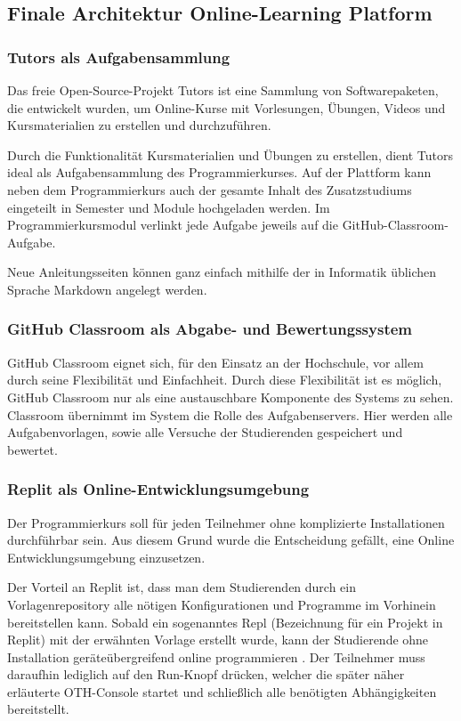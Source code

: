 \subsection{Finale Architektur Online-Learning Platform}
\subsubsection{Tutors als Aufgabensammlung}
Das freie Open-Source-Projekt Tutors ist eine Sammlung von Softwarepaketen,
die entwickelt wurden, um Online-Kurse mit Vorlesungen, Übungen, Videos und
Kursmaterialien zu erstellen und durchzuführen. \parencite{tutors}

Durch die Funktionalität Kursmaterialien und Übungen zu erstellen, dient Tutors
ideal als Aufgabensammlung des Programmierkurses. Auf der Plattform kann neben
dem Programmierkurs auch der gesamte Inhalt des Zusatzstudiums eingeteilt in
Semester und Module hochgeladen werden. Im Programmierkursmodul verlinkt jede 
Aufgabe jeweils auf die GitHub-Classroom-Aufgabe.

Neue Anleitungsseiten können ganz einfach mithilfe der in Informatik üblichen
Sprache Markdown angelegt werden.

\subsubsection{GitHub Classroom als Abgabe- und Bewertungssystem}
GitHub Classroom eignet sich, für den Einsatz an der Hochschule, vor allem durch
seine Flexibilität und Einfachheit. Durch diese Flexibilität ist es möglich,
GitHub Classroom nur als eine austauschbare Komponente des Systems zu sehen.
Classroom übernimmt im System die Rolle des Aufgabenservers. Hier werden alle
Aufgabenvorlagen, sowie alle Versuche der Studierenden gespeichert und bewertet.

\subsubsection{Replit als Online-Entwicklungsumgebung}
Der Programmierkurs soll für jeden Teilnehmer ohne komplizierte Installationen
durchführbar sein. Aus diesem Grund wurde die Entscheidung gefällt, eine
Online Entwicklungsumgebung einzusetzen.

Der Vorteil an Replit ist, dass man dem Studierenden durch ein
Vorlagenrepository alle nötigen Konfigurationen und Programme im Vorhinein
bereitstellen kann. Sobald ein sogenanntes \glqq Repl\grqq{} (Bezeichnung für
ein Projekt in Replit) mit der erwähnten Vorlage erstellt wurde, kann der
Studierende ohne Installation geräteübergreifend online programmieren
\parencite{replit-import-from-github}. Der Teilnehmer muss daraufhin lediglich auf
den \glqq Run\grqq{}-Knopf drücken, welcher die später näher erläuterte
\glqq OTH-Console\grqq{} startet und schließlich alle benötigten Abhängigkeiten bereitstellt.